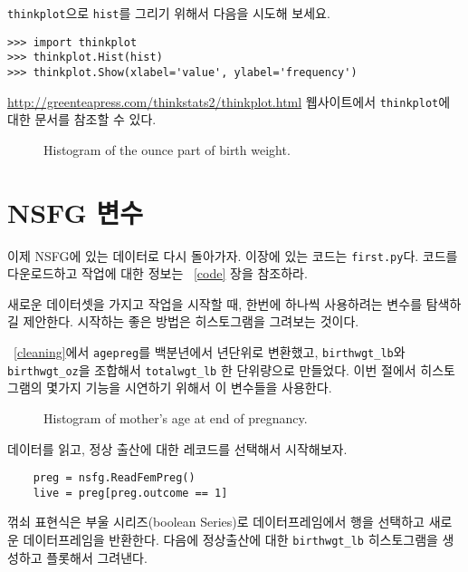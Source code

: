 
{\tt thinkplot}으로 {\tt hist}를 그리기 위해서 다음을 시도해 보세요.


\begin{verbatim}
>>> import thinkplot
>>> thinkplot.Hist(hist)
>>> thinkplot.Show(xlabel='value', ylabel='frequency')
\end{verbatim}

\url{http://greenteapress.com/thinkstats2/thinkplot.html} 웹사이트에서
{\tt thinkplot}에 대한 문서를 참조할 수 있다.

\begin{figure}
\caption{Histogram of the ounce part of birth weight.}
\label{first_wgt_oz_hist}
\end{figure}


\section{NSFG 변수}

이제 NSFG에 있는 데이터로 다시 돌아가자. 이장에 있는 코드는 {\tt first.py}다. 
코드를 다운로드하고 작업에 대한 정보는 ~\ref{code} 장을 참조하라.

새로운 데이터셋을 가지고 작업을 시작할 때, 한번에 하나씩 사용하려는 변수를 탐색하길 제안한다. 
시작하는 좋은 방법은 히스토그램을 그려보는 것이다.



~\ref{cleaning}에서 {\tt agepreg}를 백분년에서 년단위로 변환했고,
\verb"birthwgt_lb"와 \verb"birthwgt_oz"을 조합해서 \verb"totalwgt_lb" 한 단위량으로 만들었다.
이번 절에서 히스토그램의 몇가지 기능을 시연하기 위해서 이 변수들을 사용한다.


\begin{figure}
\caption{Histogram of mother's age at end of pregnancy.}
\label{first_agepreg_hist}
\end{figure}

데이터를 읽고, 정상 출산에 대한 레코드를 선택해서 시작해보자.


\begin{verbatim}
    preg = nsfg.ReadFemPreg()
    live = preg[preg.outcome == 1]
\end{verbatim}

꺾쇠 표현식은 부울 시리즈(boolean Series)로 데이터프레임에서 행을 선택하고 새로운 데이터프레임을 반환한다. 다음에 정상출산에 대한 \verb"birthwgt_lb" 히스토그램을 생성하고 플롯해서 그려낸다.

